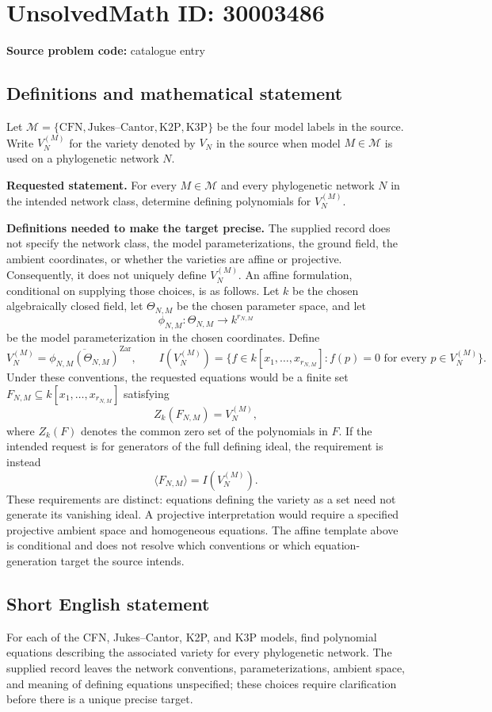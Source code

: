 \documentclass[11pt]{article}
\begin{document}
\section*{UnsolvedMath ID: 30003486}
\textbf{Source problem code:} catalogue entry
\subsection{Definitions and mathematical statement}
Let \(\mathcal M=\{\mathrm{CFN},\text{Jukes--Cantor},\mathrm{K2P},\mathrm{K3P}\}\) be the four model labels in the source. Write \(V_N^{(M)}\) for the variety denoted by \(V_N\) in the source when model \(M\in\mathcal M\) is used on a phylogenetic network \(N\).

\textbf{Requested statement.} For every \(M\in\mathcal M\) and every phylogenetic network \(N\) in the intended network class, determine defining polynomials for \(V_N^{(M)}\).

\textbf{Definitions needed to make the target precise.} The supplied record does not specify the network class, the model parameterizations, the ground field, the ambient coordinates, or whether the varieties are affine or projective. Consequently, it does not uniquely define \(V_N^{(M)}\). An affine formulation, conditional on supplying those choices, is as follows. Let \(k\) be the chosen algebraically closed field, let \(\Theta_{N,M}\) be the chosen parameter space, and let
\[
\phi_{N,M}:\Theta_{N,M}\longrightarrow k^{r_{N,M}}
\]
be the model parameterization in the chosen coordinates. Define
\[
V_N^{(M)}=\overline{\phi_{N,M}(\Theta_{N,M})}^{\mathrm{Zar}},\qquad
I(V_N^{(M)})=\{f\in k[x_1,\ldots,x_{r_{N,M}}]:f(p)=0\text{ for every }p\in V_N^{(M)}\}.
\]
Under these conventions, the requested equations would be a finite set \(F_{N,M}\subseteq k[x_1,\ldots,x_{r_{N,M}}]\) satisfying
\[
Z_k(F_{N,M})=V_N^{(M)},
\]
where \(Z_k(F)\) denotes the common zero set of the polynomials in \(F\). If the intended request is for generators of the full defining ideal, the requirement is instead
\[
\langle F_{N,M}\rangle=I(V_N^{(M)}).
\]
These requirements are distinct: equations defining the variety as a set need not generate its vanishing ideal. A projective interpretation would require a specified projective ambient space and homogeneous equations. The affine template above is conditional and does not resolve which conventions or which equation-generation target the source intends.
\subsection{Short English statement}
For each of the CFN, Jukes--Cantor, K2P, and K3P models, find polynomial equations describing the associated variety for every phylogenetic network. The supplied record leaves the network conventions, parameterizations, ambient space, and meaning of defining equations unspecified; these choices require clarification before there is a unique precise target.
\end{document}
